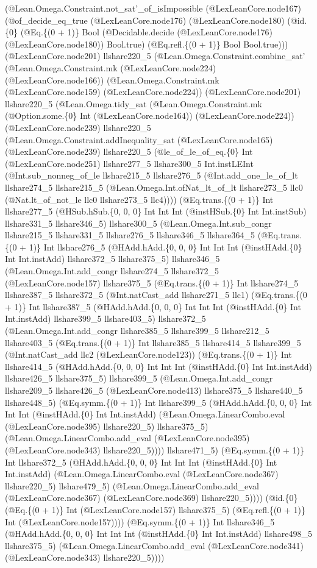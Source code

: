 \documentclass[11pt]{article}
\begin{document}
(@Lean.Omega.Constraint.not\_sat'\_of\_isImpossible (@LexLeanCore.node167) (@of\_decide\_eq\_true (@LexLeanCore.node176) (@LexLeanCore.node180) (@id.\{0\} (@Eq.\{(0 + 1)\} Bool (@Decidable.decide (@LexLeanCore.node176) (@LexLeanCore.node180)) Bool.true) (@Eq.refl.\{(0 + 1)\} Bool Bool.true))) (@LexLeanCore.node201) llshare220\_5 (@Lean.Omega.Constraint.combine\_sat' (@Lean.Omega.Constraint.mk (@LexLeanCore.node224) (@LexLeanCore.node166)) (@Lean.Omega.Constraint.mk (@LexLeanCore.node159) (@LexLeanCore.node224)) (@LexLeanCore.node201) llshare220\_5 (@Lean.Omega.tidy\_sat (@Lean.Omega.Constraint.mk (@Option.some.\{0\} Int (@LexLeanCore.node164)) (@LexLeanCore.node224)) (@LexLeanCore.node239) llshare220\_5 (@Lean.Omega.Constraint.addInequality\_sat (@LexLeanCore.node165) (@LexLeanCore.node239) llshare220\_5 (@le\_of\_le\_of\_eq.\{0\} Int (@LexLeanCore.node251) llshare277\_5 llshare300\_5 Int.instLEInt (@Int.sub\_nonneg\_of\_le llshare215\_5 llshare276\_5 (@Int.add\_one\_le\_of\_lt llshare274\_5 llshare215\_5 (@Lean.Omega.Int.ofNat\_lt\_of\_lt llshare273\_5 llc0 (@Nat.lt\_of\_not\_le llc0 llshare273\_5 llc4)))) (@Eq.trans.\{(0 + 1)\} Int llshare277\_5 (@HSub.hSub.\{0, 0, 0\} Int Int Int (@instHSub.\{0\} Int Int.instSub) llshare331\_5 llshare346\_5) llshare300\_5 (@Lean.Omega.Int.sub\_congr llshare215\_5 llshare331\_5 llshare276\_5 llshare346\_5 llshare364\_5 (@Eq.trans.\{(0 + 1)\} Int llshare276\_5 (@HAdd.hAdd.\{0, 0, 0\} Int Int Int (@instHAdd.\{0\} Int Int.instAdd) llshare372\_5 llshare375\_5) llshare346\_5 (@Lean.Omega.Int.add\_congr llshare274\_5 llshare372\_5 (@LexLeanCore.node157) llshare375\_5 (@Eq.trans.\{(0 + 1)\} Int llshare274\_5 llshare387\_5 llshare372\_5 (@Int.natCast\_add llshare271\_5 llc1) (@Eq.trans.\{(0 + 1)\} Int llshare387\_5 (@HAdd.hAdd.\{0, 0, 0\} Int Int Int (@instHAdd.\{0\} Int Int.instAdd) llshare399\_5 llshare403\_5) llshare372\_5 (@Lean.Omega.Int.add\_congr llshare385\_5 llshare399\_5 llshare212\_5 llshare403\_5 (@Eq.trans.\{(0 + 1)\} Int llshare385\_5 llshare414\_5 llshare399\_5 (@Int.natCast\_add llc2 (@LexLeanCore.node123)) (@Eq.trans.\{(0 + 1)\} Int llshare414\_5 (@HAdd.hAdd.\{0, 0, 0\} Int Int Int (@instHAdd.\{0\} Int Int.instAdd) llshare426\_5 llshare375\_5) llshare399\_5 (@Lean.Omega.Int.add\_congr llshare209\_5 llshare426\_5 (@LexLeanCore.node413) llshare375\_5 llshare440\_5 llshare448\_5) (@Eq.symm.\{(0 + 1)\} Int llshare399\_5 (@HAdd.hAdd.\{0, 0, 0\} Int Int Int (@instHAdd.\{0\} Int Int.instAdd) (@Lean.Omega.LinearCombo.eval (@LexLeanCore.node395) llshare220\_5) llshare375\_5) (@Lean.Omega.LinearCombo.add\_eval (@LexLeanCore.node395) (@LexLeanCore.node343) llshare220\_5)))) llshare471\_5) (@Eq.symm.\{(0 + 1)\} Int llshare372\_5 (@HAdd.hAdd.\{0, 0, 0\} Int Int Int (@instHAdd.\{0\} Int Int.instAdd) (@Lean.Omega.LinearCombo.eval (@LexLeanCore.node367) llshare220\_5) llshare479\_5) (@Lean.Omega.LinearCombo.add\_eval (@LexLeanCore.node367) (@LexLeanCore.node369) llshare220\_5)))) (@id.\{0\} (@Eq.\{(0 + 1)\} Int (@LexLeanCore.node157) llshare375\_5) (@Eq.refl.\{(0 + 1)\} Int (@LexLeanCore.node157)))) (@Eq.symm.\{(0 + 1)\} Int llshare346\_5 (@HAdd.hAdd.\{0, 0, 0\} Int Int Int (@instHAdd.\{0\} Int Int.instAdd) llshare498\_5 llshare375\_5) (@Lean.Omega.LinearCombo.add\_eval (@LexLeanCore.node341) (@LexLeanCore.node343) llshare220\_5)))) 
\end{document}

